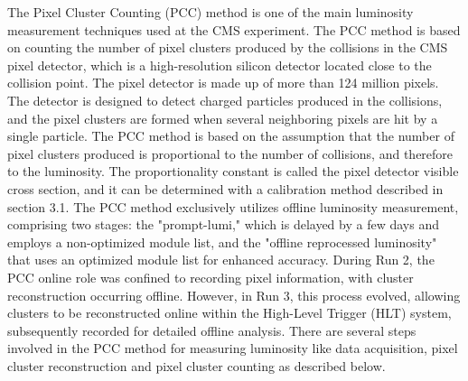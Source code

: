 The Pixel Cluster Counting (PCC) method is one of the main luminosity measurement techniques used at the CMS experiment. The PCC method is based on counting the number of pixel clusters produced by the collisions in the CMS pixel detector, which is a high-resolution silicon detector located close to the collision point. The pixel detector is made up of more than 124 million pixels. The detector is designed to detect charged particles produced in the collisions, and the pixel clusters are formed when several neighboring pixels are hit by a single particle. The PCC method is based on the assumption that the number of pixel clusters produced is proportional to the number of collisions, and therefore to the luminosity. The proportionality constant is called the pixel detector visible cross section, and it can be determined with a calibration method described in section 3.1. The PCC method exclusively utilizes offline luminosity measurement, comprising two stages: the "prompt-lumi," which is delayed by a few days and employs a non-optimized module list, and the "offline reprocessed luminosity" that uses an optimized module list for enhanced accuracy. During Run 2, the PCC online role was confined to recording pixel information, with cluster reconstruction occurring offline. However, in Run 3, this process evolved, allowing clusters to be reconstructed online within the High-Level Trigger (HLT) system, subsequently recorded for detailed offline analysis.
There are several steps involved in the PCC method for measuring luminosity like data acquisition, pixel cluster reconstruction and pixel cluster counting as described below.

